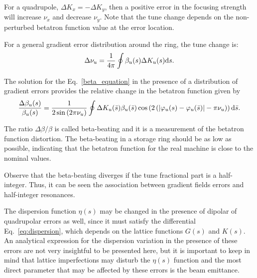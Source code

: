 For a quadrupole, $\Delta K_x = - \Delta K_y$, then a positive error in the focusing strength will increase $\nu_x$ and decrease $\nu_y$. Note that the tune change depends on the non-perturbed betatron function value at the error location.

For a general gradient error distribution around the ring, the tune change is:
\begin{equation}
    \Delta \nu_u = \dfrac{1}{4 \pi} \oint \beta_u ({s}) \Delta K_u ({s})\mathrm{d} {s}.
    \label{eq:tune_shift}
\end{equation}

The solution for the Eq.~\eqref{beta_equation} in the presence of a distribution of gradient errors provides the relative change in the betatron function given by
\begin{equation}
    \dfrac{\Delta \beta_u(s)}{\beta_u(s)} = \dfrac{1}{2\sin\left(2\pi \nu_u\right)} \oint \Delta K_u(\bar{s}) \beta_u(\bar{s}) \cos\left(2\left(|\varphi_{u}(s) - \varphi_{u}(\bar{s})| - \pi\nu_{u} \right)\right) \mathrm{d} \bar{s}.
\end{equation}

The ratio $\Delta \beta/\beta$ is called beta-beating and it is a measurement of the betatron function distortion. The beta-beating in a storage ring should be as low as possible, indicating that the betatron function for the real machine is close to the nominal values.

Observe that the beta-beating diverges if the tune fractional part is a half-integer. Thus, it can be seen the association between gradient fields errors and half-integer resonances.

The dispersion function $\eta(s)$ may be changed in the presence of dipolar of quadrupolar errors as well, since it must satisfy the differential Eq.~\eqref{eq:dispersion}, which depends on the lattice functions $G(s)$ and $K(s)$. An analytical expression for the dispersion variation in the presence of these errors are not very insightful to be presented here, but it is important to keep in mind that lattice imperfections may disturb the $\eta(s)$ function and the most direct parameter that may be affected by these errors is the beam emittance.
